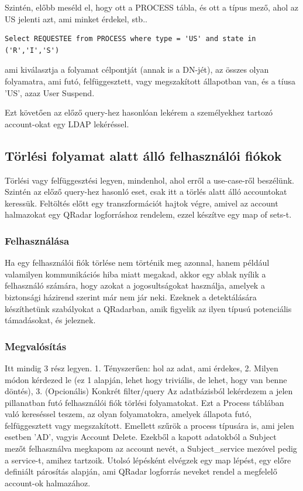 		\laci Szintén, előbb meséld el, hogy ott a PROCESS tábla, és ott a típus mező, ahol az US jelenti azt, ami minket érdekel, stb..
		\begin{lstlisting}
Select REQUESTEE from PROCESS where type = 'US' and state in ('R','I','S')
\end{lstlisting}
		ami kiválasztja a folyamat célpontját (annak is a DN-jét), az összes olyan folyamatra, ami futó, felfüggesztett, vagy megszakított állapotban van, és a tíusa 'US', azaz User Suspend.
		
		Ezt követően az előző query-hez hasonlóan lekérem a személyekhez tartozó account-okat egy LDAP lekéréssel.
		
\subsection{Törlési folyamat alatt álló felhasználói fiókok} 
\laci Törlési vagy felfüggesztési legyen, mindenhol, ahol erről a use-case-ről beszélünk.
Szintén az előző query-hez hasonló eset, csak itt a törlés alatt álló accountokat keressük. Feltöltés előtt egy transzformációt hajtok végre, amivel az account halmazokat egy QRadar logforráshoz rendelem, ezzel készítve egy map of sets-t.  
	\subsubsection{Felhasználása}
		Ha egy felhasználói fiók törlése nem történik meg azonnal, 
		hanem például valamilyen kommunikációs hiba miatt megakad, akkor egy ablak nyílik a felhasználó számára, hogy azokat a jogosultságokat használja, amelyek a biztonsági házirend szerint már nem jár neki. Ezeknek a detektálására készíthetünk szabályokat a QRadarban, amik figyelik az ilyen típusú potenciális támadásokat, és jeleznek.
		 
	\subsubsection{Megvalósítás}
	\laci Itt mindig 3 rész legyen. 1. Tényszerűen: hol az adat, ami érdekes, 2. Milyen módon kérdezed le (ez 1 alapján, lehet hogy triviális, de lehet, hogy van benne döntés), 3. (Opcionális) Konkrét filter/query 
		Az adatbázisból lekérdezem a jelen pillanatban futó felhasználói fiók törlési folyamatokat. Ezt a Process táblában való kereséssel teszem, az olyan folyamatokra, amelyek állapota futó, felfüggesztett vagy megszakított. Emellett szűrök a process típusára is, ami jelen esetben 'AD', vagyis Account Delete. Ezekből a kapott adatokból a Subject mezőt felhasználva megkapom az account nevét, a Subject\_service mezóvel pedig a service-t, amihez tartzoik. Utolsó lépésként elvégzek egy map lépést, egy előre definiált párosítás alapján, ami QRadar logforrás neveket rendel a megfelelő account-ok halmazához.
	
